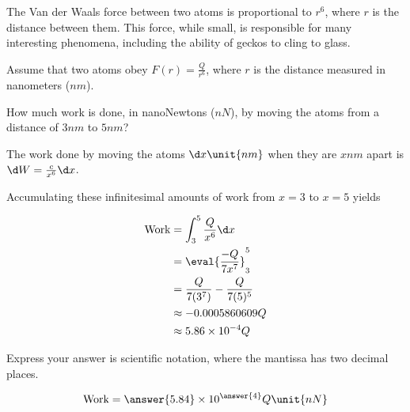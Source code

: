 \documentclass{ximera}
\author{Steven Gubkin}
\begin{document}
\begin{exercise}


The Van der Waals force between two atoms is proportional to $r^6$, where $r$ is the distance between them.  This force, while small, is responsible for many interesting phenomena, including the ability of geckos to cling to glass.

Assume that two atoms obey $F(r) = \frac{Q}{r^6}$, where $r$ is the distance measured in nanometers ($\unit{nm}$).

How much work is done, in nanoNewtons ($\unit{nN}$), by moving the atoms from a distance of  $3 \unit{nm}$ to $5 \unit{nm}$?

\begin{hint}
The work done by moving the atoms $\d x \unit{nm}$ when they are $x \unit{nm}$ apart is $\d W = \frac{c}{x^6} \d x$.
\end{hint}

\begin{hint}
Accumulating these infinitesimal amounts of work from $x = 3$ to $x = 5$ yields

\begin{align*}
\textrm{Work} &=  \int_3^5 \frac{Q}{x^6} \d x\\
	&= \eval{\frac{-Q}{7x^7}}_3^5\\
	&=\frac{Q}{7(3^7)} - \frac{Q}{7(5)^5}\\
	&\approx -0.0005860609 Q\\
	&\approx 5.86 \times 10^{-4} Q
\end{align*}
\end{hint}

\begin{prompt}
	Express your answer is scientific notation, where the mantissa has two decimal places.
	
	\[
	\textrm{Work} = \answer{5.84} \times 10^{\answer{4}} Q \unit{nN}
	\]
\end{prompt}

\end{exercise}
\end{document}
